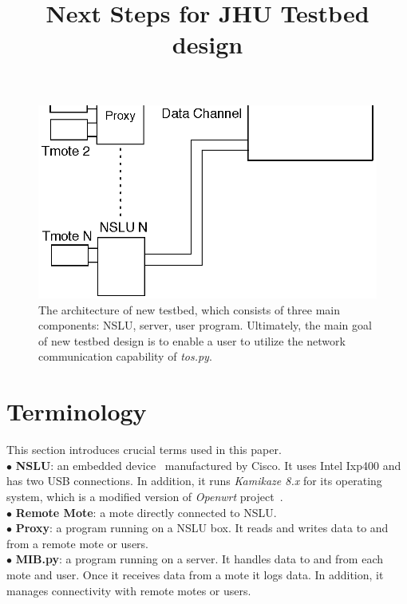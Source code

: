 \documentclass[10pt,conference]{IEEEtran}
\begin{document}
\title{Next Steps for JHU Testbed design}

\author{
}

\maketitle

\begin{abstract}
\end{abstract}
\begin{figure}[t]
  \includegraphics[width=.45\textwidth]{./figs/arch.eps}
  \caption{
  The architecture of new testbed, which consists of three main components:
  NSLU, server, user program.  Ultimately, the main goal of new testbed design
  is to enable a user to utilize the network communication capability of
  \textit{tos.py}.
  }
  \label{fig:arch}
\end{figure}

\section{Terminology}
This section introduces crucial terms used in this paper.\\
$\bullet$ \textbf{NSLU}: an embedded device~\cite{NSLU} manufactured by Cisco.
It uses Intel Ixp400 and has two USB connections.  In addition, it runs
\textit{Kamikaze 8.x} for its operating system, which is a modified version of
\textit{Openwrt} project~\cite{openwrt}.\\
$\bullet$ \textbf{Remote Mote}: a mote directly connected to NSLU. \\
$\bullet$ \textbf{Proxy}: a program running on a NSLU box. It reads and writes 
data to and from a remote mote or users. \\
$\bullet$ \textbf{MIB.py}: a program running on a server. It handles data 
to and from each mote and user. Once it receives data from a mote it logs
data. In addition, it manages connectivity with remote motes or users. \\
\end{document}

